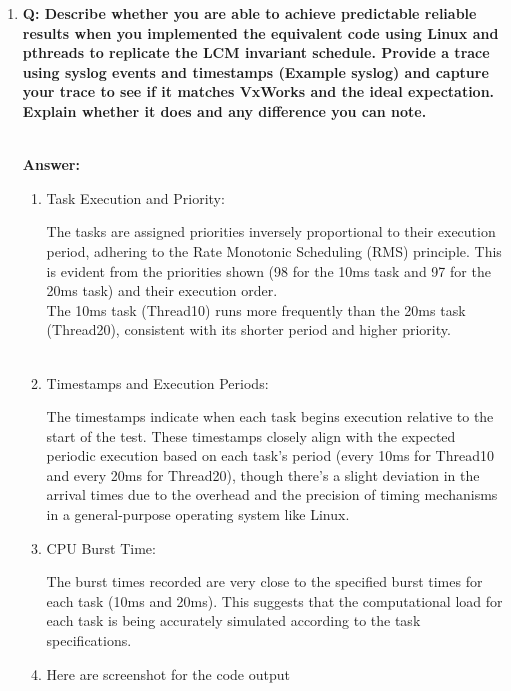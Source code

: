 \documentclass[a4paper,11pt]{article}%
\newenvironment{qanda}{\setlength{\parindent}{0pt}}{\bigskip}
\newcommand{\Q}{\bigskip\bfseries Q: }
\newcommand{\A}{\par\textbf{Answer: } \normalfont}
\begin{document}
\begin{qanda}
\begin{enumerate}
\begin{enumerate}
\begin{enumerate}
					
					
				\end{enumerate}

				
				\item \Q Describe whether you are able to achieve predictable reliable results when you implemented the equivalent code using Linux and pthreads to replicate the LCM invariant schedule. Provide a trace using syslog events and timestamps (Example syslog) and capture your trace to see if it matches VxWorks and the ideal expectation. Explain whether it does and any difference you can note.\\\\
				\A
				\begin{enumerate}
					\item Task Execution and Priority:

					The tasks are assigned priorities inversely proportional to their execution period, adhering to the Rate Monotonic Scheduling (RMS) principle. This is evident from the priorities shown (98 for the 10ms task and 97 for the 20ms task) and their execution order.\\
					The 10ms task (Thread10) runs more frequently than the 20ms task (Thread20), consistent with its shorter period and higher priority.\\\\
					\item Timestamps and Execution Periods:
				
					The timestamps indicate when each task begins execution relative to the start of the test. These timestamps closely align with the expected periodic execution based on each task's period (every 10ms for Thread10 and every 20ms for Thread20), though there's a slight deviation in the arrival times due to the overhead and the precision of timing mechanisms in a general-purpose operating system like Linux.\\
					\item CPU Burst Time:
				
					The burst times recorded are very close to the specified burst times for each task (10ms and 20ms). This suggests that the computational load for each task is being accurately simulated according to the task specifications.

					\item Here are screenshot for the code output
					

\end{enumerate}
\end{enumerate}
\end{enumerate}
\end{qanda}
\end{document}
